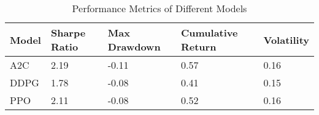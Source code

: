 \begin{table}[H]
\centering
\begin{tabular}{|l|l|l|l|l|}
\hline
Model & Sharpe Ratio & Max Drawdown & Cumulative Return & Volatility \\ \hline
A2C & 2.19 & -0.11 & 0.57 & 0.16 \\ \hline
DDPG & 1.78 & -0.08 & 0.41 & 0.15 \\ \hline
PPO & 2.11 & -0.08 & 0.52 & 0.16 \\ \hline
\end{tabular}
\caption{Performance Metrics of Different Models}
\label{tab:metrics}
\end{table}